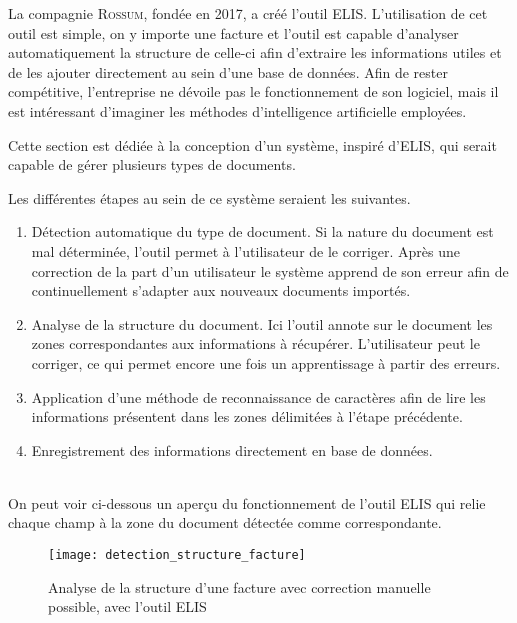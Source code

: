 La compagnie \textsc{Rossum}, fondée en 2017, a créé l'outil ELIS.
L'utilisation de cet outil est simple, on y importe une facture et l'outil est capable d'analyser automatiquement la structure de celle-ci afin d'extraire les informations utiles et de les ajouter directement au sein d'une base de données.
Afin de rester compétitive, l'entreprise ne dévoile pas le fonctionnement de son logiciel, mais il est intéressant d'imaginer les méthodes d'intelligence artificielle employées.

Cette section est dédiée à la conception d'un système, inspiré d'ELIS, qui serait capable de gérer plusieurs types de documents.

Les différentes étapes au sein de ce système seraient les suivantes.
\\
\begin{enumerate}
    \item Détection automatique du type de document. Si la nature du document est mal déterminée, l'outil permet à l'utilisateur de le corriger. Après une correction de la part d'un utilisateur le système apprend de son erreur afin de continuellement s'adapter aux nouveaux documents importés.
    
    \item Analyse de la structure du document. Ici l'outil annote sur le document les zones correspondantes aux informations à récupérer. L'utilisateur peut le corriger, ce qui permet encore une fois un apprentissage à partir des erreurs.
    
    \item Application d'une méthode de reconnaissance de caractères afin de lire les informations présentent dans les zones délimitées à l'étape précédente.
    
    \item Enregistrement des informations directement en base de données.
\end{enumerate}
~\\

On peut voir ci-dessous un aperçu du fonctionnement de l'outil ELIS qui relie chaque champ à la zone du document détectée comme correspondante.

\FloatBarrier
\begin{figure}[h!]
    \begin{center}
        \texttt{[image: detection\_structure\_facture]}
    \end{center}
    \caption{Analyse de la structure d'une facture avec correction manuelle possible, avec l'outil ELIS}
    \label{figure:detection_structure_facture}
\end{figure}
\FloatBarrier

